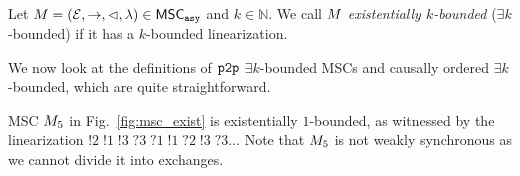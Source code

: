 \noindent
\begin{minipage}[c]{10.5cm}

	\begin{definition}\label{def:ek_bounded_msc}
		Let $M = (\mathcal{E}, \rightarrow, \lhd, \lambda) \in \mathsf{MSC}_{\mathtt{asy}}$ and $k \in \mathbb{N}$. We call $M$ \emph{existentially $k$-bounded} ($\exists k$-bounded) if it has a $k$-bounded linearization.
	\end{definition}
	We now look at the definitions of $\mathtt{p2p}$ $\exists k$-bounded MSCs and causally ordered $\exists k$-bounded, which are quite straightforward.

	\begin{example}
	MSC $M_{5}$ in Fig.~\ref{fig:msc_exist}
	is existentially $1$-bounded, as witnessed by the linearization $!2\;!1\;!3\;?3\;?1\;!1\;?2\;!3\;?3 \ldots$
	Note that $M_{5}$ is not weakly synchronous as we cannot divide it into exchanges.
	\end{example}
\end{minipage}
